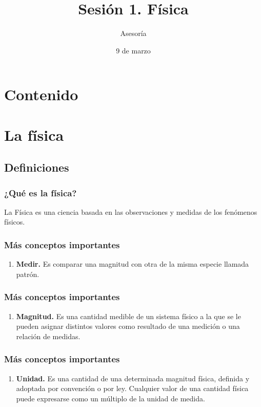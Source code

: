 \documentclass[12pt]{beamer}
\date{9 de marzo}
\title{Sesión 1. Física}
\subtitle{Asesoría}
\begin{document}
\maketitle
\fontsize{14}{14}\selectfont
{}

\section*{Contenido}

\section{La física}

\subsection{Definiciones}
\begin{frame}
\frametitle{¿Qué es la física?}
La Física es una ciencia basada en las observaciones y medidas de los fenómenos físicos.
\end{frame}
\begin{frame}
\frametitle{Más conceptos importantes}
\begin{enumerate}[<+->]
\item \textbf{Medir.} Es comparar una magnitud con otra de la misma especie llamada patrón.
\seti
\end{enumerate}
\end{frame}
\begin{frame}
\frametitle{Más conceptos importantes}
\begin{enumerate}[<+->]
\conti    
\item \textbf{Magnitud.} Es una cantidad medible de un sistema físico a la que se le pueden asignar distintos valores como resultado de una medición o una relación de medidas.
\seti
\end{enumerate}
\end{frame}
\begin{frame}
\frametitle{Más conceptos importantes}
\begin{enumerate}[<+->]
\conti
\item \textbf{Unidad.}  Es una cantidad de una determinada magnitud física, definida y adoptada por convención o por ley. Cualquier valor de una cantidad física puede expresarse como un múltiplo de la unidad de medida.
\end{enumerate}
\end{frame}
\end{document}
